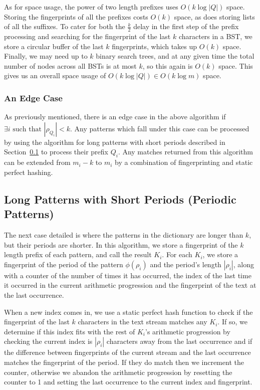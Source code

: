 \documentclass[ %
                    author={Dominic Joseph Moylett},
                    degree={MEng},
                     title={Dictionary Matching with Fingerprints},
                  subtitle={An Empirical Analysis},
                      type={research},
                      year={2015} ]{dissertation}
\begin{document}
As for space usage, the power of two length prefixes uses $O(k\log|Q|)$ space. Storing the fingerprints of all the prefixes costs $O(k)$ space, as does storing lists of all the suffixes. To cater for both the $\frac{k}{2}$ delay in the first step of the prefix processing and searching for the fingerprint of the last $k$ characters in a BST, we store a circular buffer of the last $k$ fingerprints, which takes up $O(k)$ space. Finally, we may need up to $k$ binary search trees, and at any given time the total number of nodes across all BSTs is at most $k$, so this again is $O(k)$ space. This gives us an overall space usage of $O(k\log|Q|) \in O(k\log m)$ space.

\subsubsection{An Edge Case}
\label{sssec:edge-case-theory}

As previously mentioned, there is an edge case in the above algorithm if $\exists i \text{ such that } |\rho_{Q_i}| < k$. Any patterns which fall under this case can be processed by using the algorithm for long patterns with short periods described in Section~\ref{ssec:periodic-theory} to process their prefix $Q_i$. Any matches returned from this algorithm can be extended from $m_i - k$ to $m_i$ by a combination of fingerprinting and static perfect hashing.

\subsection{Long Patterns with Short Periods (Periodic Patterns)}
\label{ssec:periodic-theory}

The next case detailed is where the patterns in the dictionary are longer than $k$, but their periods are shorter. In this algorithm, we store a fingerprint of the $k$ length prefix of each pattern, and call the result $K_i$. For each $K_i$, we store a fingerprint of the period of the pattern $\phi(\rho_i)$ and the period's length $|\rho_i|$, along with a counter of the number of times it has occurred, the index of the last time it occurred in the current arithmetic progression and the fingerprint of the text at the last occurrence.

When a new index comes in, we use a static perfect hash function to check if the fingerprint of the last $k$ characters in the text stream matches any $K_i$. If so, we determine if this index fits with the rest of $K_i$'s arithmetic progression by checking the current index is $|\rho_i|$ characters away from the last occurrence and if the difference between fingerprints of the current stream and the last occurrence matches the fingerprint of the period. If they do match then we increment the counter, otherwise we abandon the arithmetic progression by resetting the counter to 1 and setting the last occurrence to the current index and fingerprint.
\end{document}
